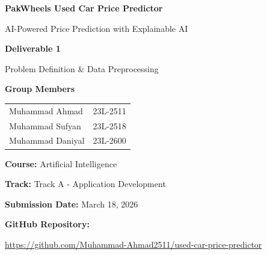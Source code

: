\documentclass[12pt,a4paper]{article}
\begin{document}
\begin{titlepage}
    \centering
    \vspace*{2cm}
    
    {\Huge\bfseries PakWheels Used Car Price Predictor\par}
    \vspace{0.5cm}
    {\Large AI-Powered Price Prediction with Explainable AI\par}
    \vspace{2cm}
    
    {\Large\textbf{Deliverable 1}\par}
    {\large Problem Definition \& Data Preprocessing\par}
    \vspace{2cm}
    
    {\Large\textbf{Group Members}\par}
    \vspace{0.5cm}
    \begin{tabular}{ll}
        Muhammad Ahmad & 23L-2511 \\
        Muhammad Sufyan & 23L-2518 \\
        Muhammad Daniyal & 23L-2600 \\
    \end{tabular}
    \vspace{2cm}
    
    {\large\textbf{Course:} Artificial Intelligence\par}
    {\large\textbf{Track:} Track A - Application Development\par}
    \vspace{1cm}
    
    {\large\textbf{Submission Date:} March 18, 2026\par}
    \vspace{1cm}
    
    {\large\textbf{GitHub Repository:}\par}
    {\small\url{https://github.com/Muhammad-Ahmad2511/used-car-price-predictor}\par}
    
    \vfill
\end{titlepage}


\tableofcontents
\newpage

\end{document}
